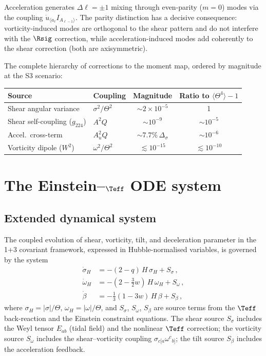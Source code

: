 Acceleration generates $\Delta\ell = \pm 1$ mixing through
even-parity ($m = 0$) modes via the coupling
$\dot{u}_{\langle a_\ell} I_{A_{\ell-1}\rangle}$.  The parity
distinction has a decisive consequence: vorticity-induced modes
are orthogonal to the shear pattern and do not interfere with
the $\Rsig$ correction, while acceleration-induced modes add
coherently to the shear correction (both are axisymmetric).

The complete hierarchy of corrections to the moment map, ordered
by magnitude at the S3 scenario:
\begin{center}\footnotesize
\begin{tabular}{llcc}
\toprule
Source & Coupling & Magnitude
  & Ratio to $\langle\Theta^4\rangle - 1$ \\
\midrule
Shear angular variance & $\sigma^2/\Theta^2$ &
  $\sim 2 \times 10^{-5}$ & 1 \\
Shear self-coupling ($g_{224}$) & $A^2 Q$ &
  $\sim 10^{-9}$ & $\sim 10^{-5}$ \\
Accel.\ cross-term & $A_{\dot{u}}^2 Q$ &
  $\sim 7.7\%\,\Delta_\sigma$ & $\sim 10^{-6}$ \\
Vorticity dipole ($W^2$) & $\omega^2/\Theta^2$ &
  $\lesssim 10^{-15}$ & $\lesssim 10^{-10}$ \\
\bottomrule
\end{tabular}
\end{center}


\section{The Einstein--$\Teff$ ODE system}\label{sec:teff-ode}\label{sec:transfer}

\subsection{Extended dynamical system}\label{sec:ode-system}

The coupled evolution of shear, vorticity, tilt, and
deceleration parameter in the 1+3 covariant framework, expressed
in Hubble-normalised variables, is governed by the system
\begin{align}
\dot{\sigma}_H &= -(2 - q)\,H\,\sigma_H + S_\sigma\,,
\label{eq:sigma-ode}\\
\dot{\omega}_H &= -(2 - \tfrac{3}{2}w)\,H\,\omega_H + S_\omega\,,
\label{eq:omega-ode}\\
\dot{\beta} &= -\tfrac{1}{3}(1 - 3w)\,H\,\beta + S_\beta\,,
\label{eq:beta-ode}
\end{align}
where $\sigma_H = |\sigma|/\Theta$,
$\omega_H = |\omega|/\Theta$, and $S_\sigma$, $S_\omega$,
$S_\beta$ are source terms from the $\Teff$ back-reaction and
the Einstein constraint equations.  The shear source
$S_\sigma$ includes the Weyl tensor $E_{ab}$ (tidal field) and
the nonlinear $\Teff$ correction; the vorticity source
$S_\omega$ includes the shear--vorticity coupling
$\sigma_{c[a}\omega^c{}_{b]}$; the tilt source $S_\beta$
includes the acceleration feedback.



